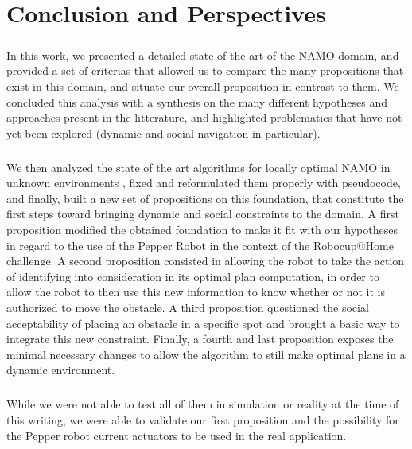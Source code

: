 
\chapter{Conclusion and Perspectives} %

\label{Chapter6} %

\paragraph{} In this work, we presented a detailed state of the art of the NAMO domain, and provided a set of criterias that allowed us to compare the many propositions that exist in this domain, and situate our overall proposition in contrast to them. We concluded this analysis with a synthesis on the many different hypotheses and approaches present in the litterature, and highlighted problematics that have not yet been explored (dynamic and social navigation in particular).

\paragraph{} We then analyzed the state of the art algorithms for locally optimal NAMO in unknown environments \parencite{wu_navigation_2010, levihn_locally_2014}, fixed and reformulated them properly with pseudocode, and finally, built a new set of propositions on this foundation, that constitute the first steps toward bringing dynamic and social constraints to the domain. A first proposition modified the obtained foundation to make it fit with our hypotheses in regard to the use of the Pepper Robot in the context of the Robocup@Home challenge. A second proposition consisted in allowing the robot to take the action of identifying into consideration in its optimal plan computation, in order to allow the robot to then use this new information to know whether or not it is authorized to move the obstacle. A third proposition questioned the social acceptability of placing an obstacle in a specific spot and brought a basic way to integrate this new constraint. Finally, a fourth and last proposition exposes the minimal necessary changes to allow the algorithm to still make optimal plans in a dynamic environment.

\paragraph{} While we were not able to test all of them in simulation or reality at the time of this writing, we were able to validate our first proposition and the possibility for the Pepper robot current actuators to be used in the real application.

